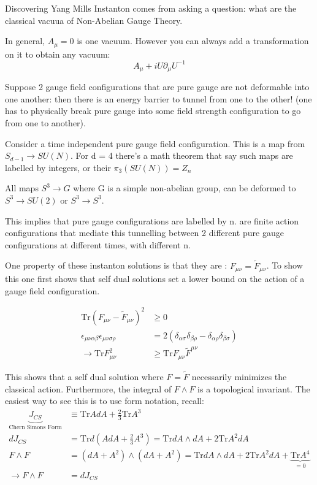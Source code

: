 \documentclass[11pt]{scrartcl}
\begin{document}
Discovering Yang Mills Instanton comes from asking a question: what are the classical vacuua of Non-Abelian Gauge Theory.

In general, $A_\mu = 0$ is one vacuum.  However you can always add a  transformation on it to obtain any vacuum:
\[A_\mu + i U \partial_\mu U^{-1} \]

Suppose 2 gauge field configurations that are pure gauge are not deformable into one another: then there is an energy barrier to tunnel from one to the other! (one has to physically break pure gauge into some field strength configuration to go from one to another).

Consider a time independent pure gauge field configuration.  This is a map from $S_{d-1} \rightarrow SU(N)$.  For d = 4 there's a math theorem that say such maps are labelled by integers, or their  $\pi_3(SU(N)) = Z_n$
\begin{theorem}
	All maps $S^3 \rightarrow G$ where G is a simple non-abelian group, can be deformed to $S^3 \rightarrow SU(2)$ or $S^3 \rightarrow S^3$.
\end{theorem}

This implies that pure gauge configurations are labelled by n.  are finite action configurations that mediate this tunnelling between 2 different pure gauge configurations at different times, with different n.


One property of these instanton solutions is that they are :
$F_{\mu \nu} = \tilde{F}_{\mu \nu}$.  To show this one first shows that self dual solutions set a lower bound on the action of a gauge field configuration. 

\begin{align}
	\mathrm{Tr} (F_{\mu \nu} - \tilde{F}_{\mu \nu} )^2  & \geq 0 \\
	\epsilon_{\mu \nu \alpha \beta} \epsilon_{\mu \nu \sigma \rho} &= 2 \left( \delta_{\alpha \sigma} \delta_{\beta \rho} - \delta_{\alpha \rho } \delta_{\beta \sigma} \right)   \\
	\rightarrow \mathrm{Tr} F_{\mu \nu}^2 & \geq \mathrm{Tr} F_{\mu \nu} \tilde{F}^{\mu \nu}
\end{align}

This shows that a self dual solution where $F = \tilde{F}$ necessarily minimizes the classical action.  Furthermore, the integral of $F \wedge F$ is a topological invariant.  The easiest way to see this is to use form notation, recall:
\begin{align}
	\underbrace{J_{CS}}_{\text{Chern Simons Form}} &\equiv \mathrm{Tr}AdA + \frac23 \mathrm{Tr}A^3  \\
 	d J_{CS} &= \mathrm{Tr} d(A dA + \frac23 A^3) = \mathrm{Tr}dA \wedge dA + 2 \mathrm{Tr} A^2dA \\
 	F \wedge F & = (dA + A^2) \wedge (dA + A^2) = \mathrm{Tr} dA \wedge dA + 2 \mathrm{Tr} A ^2 dA + \underbrace{\mathrm{Tr} A^4}_{= 0} \\
 	\rightarrow F \wedge F & = d J_{CS}
	\end{align}
\end{document}
